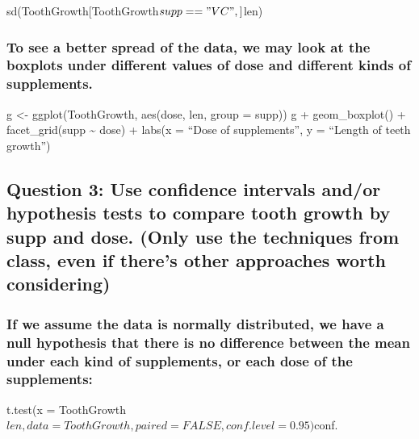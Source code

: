 \documentclass[
]{article}
\begin{document}
sd(ToothGrowth{[}ToothGrowth\(supp == "VC", ]\)len)

\hypertarget{to-see-a-better-spread-of-the-data-we-may-look-at-the-boxplots-under-different-values-of-dose-and-different-kinds-of-supplements.}{%
\subsubsection{To see a better spread of the data, we may look at the
boxplots under different values of dose and different kinds of
supplements.}\label{to-see-a-better-spread-of-the-data-we-may-look-at-the-boxplots-under-different-values-of-dose-and-different-kinds-of-supplements.}}

g \textless- ggplot(ToothGrowth, aes(dose, len, group = supp)) g +
geom\_boxplot() + facet\_grid(supp \textasciitilde{} dose) + labs(x =
``Dose of supplements'', y = ``Length of teeth growth'')

\hypertarget{question-3-use-confidence-intervals-andor-hypothesis-tests-to-compare-tooth-growth-by-supp-and-dose.-only-use-the-techniques-from-class-even-if-theres-other-approaches-worth-considering}{%
\subsection{Question 3: Use confidence intervals and/or hypothesis tests
to compare tooth growth by supp and dose. (Only use the techniques from
class, even if there's other approaches worth
considering)}\label{question-3-use-confidence-intervals-andor-hypothesis-tests-to-compare-tooth-growth-by-supp-and-dose.-only-use-the-techniques-from-class-even-if-theres-other-approaches-worth-considering}}

\hypertarget{if-we-assume-the-data-is-normally-distributed-we-have-a-null-hypothesis-that-there-is-no-difference-between-the-mean-under-each-kind-of-supplements-or-each-dose-of-the-supplements}{%
\subsubsection{If we assume the data is normally distributed, we have a
null hypothesis that there is no difference between the mean under each
kind of supplements, or each dose of the
supplements:}\label{if-we-assume-the-data-is-normally-distributed-we-have-a-null-hypothesis-that-there-is-no-difference-between-the-mean-under-each-kind-of-supplements-or-each-dose-of-the-supplements}}

t.test(x =
ToothGrowth\(len, data = ToothGrowth, paired = FALSE, conf.level = 0.95)\)conf.
\end{document}
